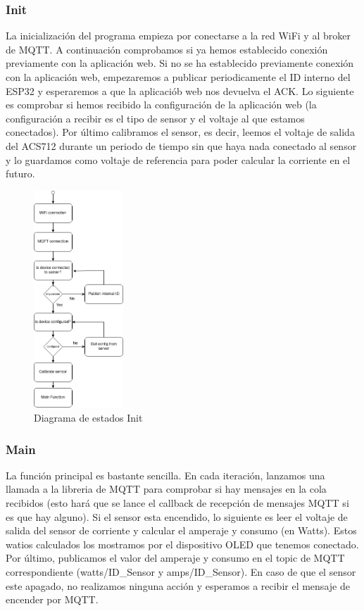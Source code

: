 \begin{titlepage}
\subsubsection{Init}
La inicialización del programa empieza por conectarse a la red WiFi y al broker de MQTT. A continuación comprobamos si ya hemos establecido conexión previamente con la aplicación web. Si no se ha establecido previamente conexión con la aplicación web, empezaremos a publicar periodicamente el ID interno del ESP32 y esperaremos a que la aplicaciób web nos devuelva el ACK. Lo siguiente es comprobar si hemos recibido la configuración de la aplicación web (la configuración a recibir es el tipo de sensor y el voltaje al que estamos conectados). Por último calibramos el sensor, es decir, leemos el voltaje de salida del ACS712 durante un periodo de tiempo sin que haya nada conectado al sensor y lo guardamos como voltaje de referencia para poder calcular la corriente en el futuro.\\
\begin{figure}[h!]
	\centering
	\includegraphics[width=0.30\textwidth]{imagenes/Init.drawio.png}
	\caption{Diagrama de estados Init}
\end{figure}
\subsubsection{Main}
La función principal es bastante sencilla. En cada iteración, lanzamos una llamada a la libreria de MQTT para comprobar si hay mensajes en la cola recibidos (esto hará que se lance el callback de recepción de mensajes MQTT si es que hay alguno). Si el sensor esta encendido, lo siguiente es leer el voltaje de salida del sensor de corriente y calcular el amperaje y consumo (en Watts). Estos watios calculados los mostramos por el dispositivo OLED que tenemos conectado. Por último, publicamos el valor del amperaje y consumo en el topic de MQTT correspondiente (watts/ID\_Sensor y amps/ID\_Sensor). En caso de que el sensor este apagado, no realizamos ninguna acción y esperamos a recibir el mensaje de encender por MQTT.\\



\end{titlepage}
